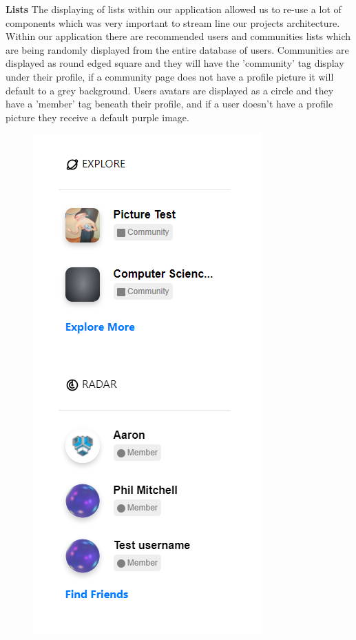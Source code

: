 \newpage
\textbf{Lists}
\newline
The displaying of lists within our application allowed us to re-use a lot of components which was very important to stream line our projects architecture. Within our application there are recommended users and communities lists which are being randomly displayed from the entire database of users. Communities are displayed as round edged square and they will have the 'community' tag display under their profile, if a community page does not have a profile picture it will default to a grey background. Users avatars are displayed as a circle and they have a 'member' tag beneath their profile, and if a user doesn't have a profile picture they receive a default purple image.

\begin{figure}[H]
  \centering
  \includegraphics[scale=0.55]{img/recommended.PNG}
  \label{fig:Recommended Users and Communities Lists}
\end{figure}

